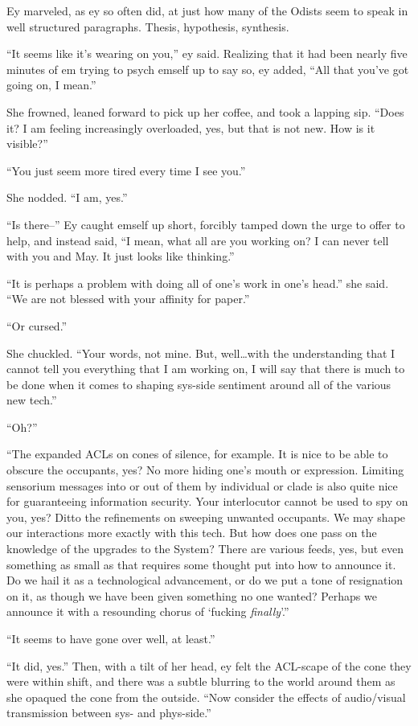 Ey marveled, as ey so often did, at just how many of the Odists seem to speak in well structured paragraphs. Thesis, hypothesis, synthesis.

``It seems like it's wearing on you,'' ey said. Realizing that it had been nearly five minutes of em trying to psych emself up to say so, ey added, ``All that you've got going on, I mean.''

She frowned, leaned forward to pick up her coffee, and took a lapping sip. ``Does it? I am feeling increasingly overloaded, yes, but that is not new. How is it visible?''

``You just seem more tired every time I see you.''

She nodded. ``I am, yes.''

``Is there--'' Ey caught emself up short, forcibly tamped down the urge to offer to help, and instead said, ``I mean, what all are you working on? I can never tell with you and May. It just looks like thinking.''

``It is perhaps a problem with doing all of one's work in one's head.'' she said. ``We are not blessed with your affinity for paper.''

``Or cursed.''

She chuckled. ``Your words, not mine. But, well\ldots with the understanding that I cannot tell you everything that I am working on, I will say that there is much to be done when it comes to shaping sys-side sentiment around all of the various new tech.''

``Oh?''

``The expanded ACLs on cones of silence, for example. It is nice to be able to obscure the occupants, yes? No more hiding one's mouth or expression. Limiting sensorium messages into or out of them by individual or clade is also quite nice for guaranteeing information security. Your interlocutor cannot be used to spy on you, yes? Ditto the refinements on sweeping unwanted occupants. We may shape our interactions more exactly with this tech. But how does one pass on the knowledge of the upgrades to the System? There are various feeds, yes, but even something as small as that requires some thought put into how to announce it. Do we hail it as a technological advancement, or do we put a tone of resignation on it, as though we have been given something no one wanted? Perhaps we announce it with a resounding chorus of `fucking \emph{finally}'.''

``It seems to have gone over well, at least.''

``It did, yes.'' Then, with a tilt of her head, ey felt the ACL-scape of the cone they were within shift, and there was a subtle blurring to the world around them as she opaqued the cone from the outside. ``Now consider the effects of audio/visual transmission between sys- and phys-side.''

